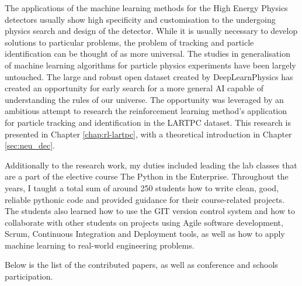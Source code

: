 The applications of the machine learning methods for the High Energy Physics detectors usually show high specificity and customisation to the undergoing physics search and design of the detector.
While it is usually necessary to develop solutions to particular problems, the problem of tracking and particle identification can be thought of as more universal.
The studies in generalisation of machine learning algorithms for particle physics experiments have been largely untouched.
The large and robust open dataset created by DeepLearnPhysics has created an opportunity for early search for a more general AI capable of understanding the rules of our universe.
The opportunity was leveraged by an ambitious attempt to research the reinforcement learning method's application for particle tracking and identification in the LARTPC dataset.
This research is presented in Chapter \ref{chap:rl-lartpc}, with a theoretical introduction in Chapter \ref{sec:neu_dec}.

Additionally to the research work, my duties included leading the lab classes that are a part of the elective course The Python in the Enterprise. Throughout the years, I taught a total sum of around 250 students how to write clean, good, reliable pythonic code and provided guidance for their course-related projects. The students also learned how to use the GIT version control system and how to collaborate with other students on projects using Agile software development, Scrum, Continuous Integration and Deployment tools, as well as how to apply machine learning to real-world engineering problems.

Below is the list of the contributed papers, as well as conference and schools participation.


